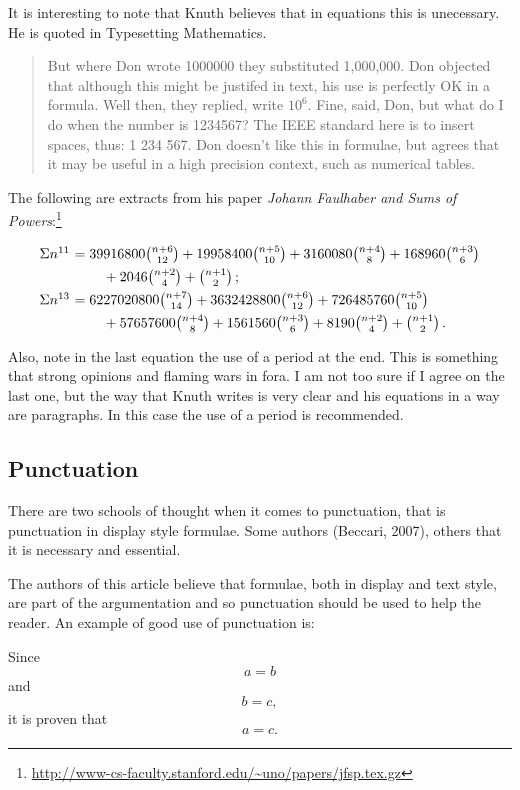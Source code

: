 {It is interesting to note that Knuth believes that in equations this is unecessary.
He is quoted in Typesetting Mathematics.


\begin{quotation}
But where Don wrote 1000000 they substituted
1,000,000. Don objected that although this might be justifed in text, his use is perfectly OK in a formula. Well then, they replied, write \(10^6\).
Fine, said, Don, but what do I do 
when the number is 1234567? The IEEE standard here is to insert spaces, thus: 1 234 567.
Don doesn't like this in formulae, but agrees that it may be useful in a high precision context, such as numerical tables. 
\end{quotation}



The following are extracts from his paper \textit{Johann Faulhaber and Sums of Powers}:\footnote{\url{http://www-cs-faculty.stanford.edu/~uno/papers/jfsp.tex.gz}}

{
\[\vcenter{\halign{$#$\hfil\ &$#$\hfil\cr
\Sigma n^{11}&=39916800{n+6\choose 12}+
19958400{n+5\choose 10}+3160080{n+4\choose 8}
+168960{n+3\choose 6}\cr
\noalign{\smallskip}
&\qquad\null+2046{n+2\choose 4}+{n+1\choose 2}\,;\cr
\noalign{\smallskip}
\Sigma n^{13}&=6227020800{n+7\choose 14}+3632428800{n+6\choose 12}+
726485760{n+5\choose 10}\cr
\noalign{\smallskip}
&\qquad\null+57657600{n+4\choose 8}
+1561560{n+3\choose 6}+8190{n+2\choose 4}+{n+1\choose 2}\,.\cr}}\]
}

Also, note in the last equation the use of a period at the end. This is something that strong opinions and flaming wars in fora. I am not too sure if I agree on the last one, but the way that Knuth writes is very clear and his equations in a way are paragraphs. In this case the use of a period is recommended.


\subsection{Punctuation}

There are two schools of thought when it comes to punctuation, that is punctuation in display style formulae. Some authors (Beccari, 2007), others that it is necessary and essential.

The authors of this article believe that formulae,
both in display and text style, are part of the argumentation
and so punctuation should be used to help
the reader. An example of good use of punctuation is:


Since
\[ a=b \]
and
\[b=c,\]
it is proven that
\[a =c. \]



}
